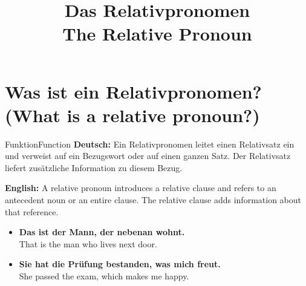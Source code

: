 \documentclass[a4paper,11pt]{article}
\title{Das Relativpronomen\\\large The Relative Pronoun}
\date{}
\newcommand{\GermanText}[1]{\textbf{Deutsch: }#1\par}
\newcommand{\EnglishText}[1]{{\small\color{SoftGray}\textbf{English: }#1\par}}
\newcommand{\ExampleItem}[2]{\item \textbf{#1}\\{\small\color{SoftGray}#2}}
\begin{document}
\maketitle
\tableofcontents
\newpage

\section{Was ist ein Relativpronomen? (What is a relative pronoun?)}
\begin{grammarentry}{Funktion}{Function}
\GermanText{Ein Relativpronomen leitet einen Relativsatz ein und verweist auf ein Bezugswort oder auf einen ganzen Satz. Der Relativsatz liefert zusätzliche Information zu diesem Bezug.}
\EnglishText{A relative pronoun introduces a relative clause and refers to an antecedent noun or an entire clause. The relative clause adds information about that reference.}
\end{grammarentry}
\begin{exbox}\begin{itemize}
\ExampleItem{Das ist der Mann, der nebenan wohnt.}{That is the man who lives next door.}
\ExampleItem{Sie hat die Prüfung bestanden, was mich freut.}{She passed the exam, which makes me happy.}
\end{itemize}\end{exbox}
\end{document}

